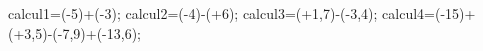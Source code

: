 \documentclass[exercice]{thedocument}%
\begin{document}
%
\>calcul1=(-5)+(-3);%
\>calcul2=(-4)-(+6);%
\>calcul3=(+1,7)-(-3,4);%
\>calcul4=(-15)+(+3,5)-(-7,9)+(-13,6);%
%
\end{document}
